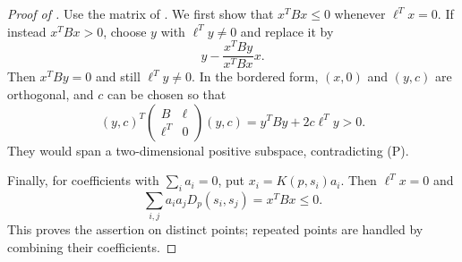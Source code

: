 \begin{proof}[Proof of ]
Use the matrix of . We first show that $x^TBx\le0$ whenever $\ell^Tx=0$. If instead $x^TBx>0$, choose $y$ with $\ell^Ty\ne0$ and replace it by
\[
y-\frac{x^TBy}{x^TBx}x.
\]
Then $x^TBy=0$ and still $\ell^Ty\ne0$. In the bordered form, $(x,0)$ and $(y,c)$ are orthogonal, and $c$ can be chosen so that
\[
(y,c)^T\begin{pmatrix}B&\ell\\\ell^T&0\end{pmatrix}(y,c)
=y^TBy+2c\ell^Ty>0.
\]
They would span a two-dimensional positive subspace, contradicting \textup{(P)}.

Finally, for coefficients with $\sum_i a_i=0$, put $x_i=K(p,s_i)a_i$. Then $\ell^Tx=0$ and
\[
\sum_{i,j}a_i a_jD_p(s_i,s_j)=x^TBx\le0.
\]
This proves the assertion on distinct points; repeated points are handled by combining their coefficients.
\end{proof}

